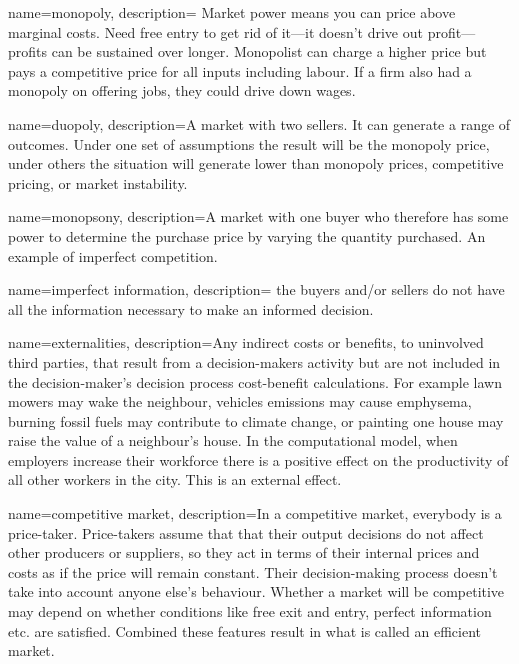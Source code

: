 {
name=monopoly,
description={ Market power means you can price above marginal costs. Need free entry to get rid of it---it doesn't drive out profit---profits can be sustained over longer. Monopolist can charge a higher price but pays a competitive price for all \glspl{input} including labour. If a firm also had a monopoly on offering jobs, they could drive down wages.}
}

{
name=duopoly,
description={A market with two sellers. It can generate a range of outcomes. Under one set of assumptions the result will be the monopoly price, under others the situation will generate lower than monopoly prices, competitive pricing, or market instability.}
}

{
name=monopsony,
description={A market with one buyer who therefore has some power to determine the purchase price by varying the quantity purchased. An example of \gls{imperfect competition}.}
}

{
name=imperfect information,
description={ the buyers and/or sellers do not have all the information necessary to make an informed decision.}
}

{
name=externalities,
description={Any indirect costs or benefits, to uninvolved third parties, that result from a decision-makers activity but are not included in the decision-maker's decision process cost-benefit calculations. For example lawn mowers may wake the neighbour, vehicles emissions may cause emphysema, burning fossil fuels may contribute to climate change, or painting one house may raise the value of a neighbour's house. In the computational model, when employers increase their workforce there is a positive effect on the productivity of all other workers in the city. This is an external effect.}
}

{
name=competitive market,
description={In a competitive market, everybody is a price-taker. Price-takers  assume that that their output decisions do not affect other producers or suppliers, so they act in terms of their internal prices and costs as if the price will remain constant. Their decision-making process doesn't take into account anyone else's behaviour.
Whether a market will be  competitive may depend on  whether conditions like free exit and entry, perfect information etc. are satisfied. Combined these features result in what is called an \gls{efficient market}.} %
}

